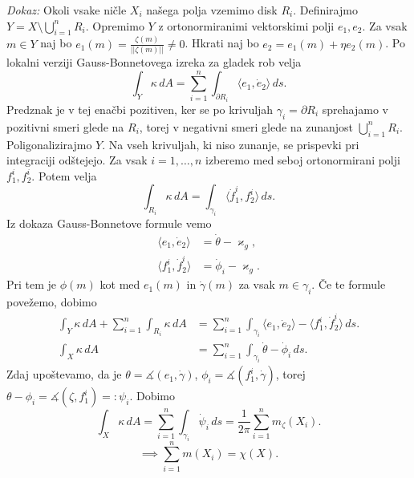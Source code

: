 \noindent
{\em Dokaz:\/}
Okoli vsake ničle $X_i$ našega polja vzemimo disk $R_i$. Definirajmo $Y = X \setminus \bigcup_{i = 1}^{n} R_i$. Opremimo $Y$ z ortonormiranimi vektorskimi polji $e_1, e_2$. Za vsak $m \in Y$ naj bo $e_1(m) = \frac{\zeta(m)}{\lvert\lvert \zeta(m) \rvert\rvert } \neq 0$. Hkrati naj bo
$e_2 = e_1(m) + \eta e_2(m)$. Po lokalni verziji Gauss-Bonnetovega izreka za gladek rob velja \begin{equation*}
\int_{Y} \kappa  \, dA = \sum_{i = 1}^{n} \int_{\partial R_i} \langle e_1, \dot{e}_2 \rangle   \, ds.  
\end{equation*}
Predznak je v tej enačbi pozitiven, ker se po krivuljah $\gamma_i = \partial R_i$ sprehajamo v pozitivni smeri glede na $R_i$, torej v negativni smeri glede na zunanjost $\bigcup_{i = 1}^{n} R_i$.    
Poligonalizirajmo $Y$. Na vseh krivuljah, ki niso zunanje, se prispevki pri integraciji odštejejo. Za vsak $i = 1 ,\ldots, n$ izberemo med seboj ortonormirani polji $f_1^{i}, f_2^{i}$. Potem velja \begin{equation*}
\int_{R_i} \kappa   \, dA = \int_{\gamma_i} \langle \dot{f}_1^{i}, f_2^{i} \rangle   \, ds.  
\end{equation*}  
Iz dokaza Gauss-Bonnetove formule vemo \begin{align*}
    \langle e_1, \dot{e}_2  \rangle  &= \dot{\theta} - \varkappa_g, \\
    \langle f_1^{i}, \dot{f}_2^{i}  \rangle  &= \dot{\phi}_i - \varkappa_g. 
\end{align*}
Pri tem je $\phi(m)$ kot med $e_1(m)$ in $\dot{\gamma}(m)$ za vsak $m \in  \gamma_i$. Če te formule povežemo, dobimo \begin{align*}
    \int_{Y} \kappa  \, dA  + \sum_{i = 1}^{n} \int_{R_i} \kappa \, dA  &= \sum_{i = 1}^{n} \int_{\gamma_i} \langle e_1, \dot{e}_2 \rangle  - \langle f_1^{i}, \dot{f}_2^{i} \rangle   \, ds.    \\
    \int_{X} \kappa  \, dA  &= \sum_{i = 1}^{n} \int_{\gamma_i} \dot{\theta} - \dot{\phi}_i \, ds.  
\end{align*}
Zdaj upoštevamo, da je $\theta = \measuredangle{(e_1, \dot{\gamma})}$, $\phi_i = \measuredangle{(f_1^{i}, \dot{\gamma})}$, torej $\theta - \phi_i = \measuredangle{(\zeta, f_1^{i})} =: \psi_i$.
Dobimo \begin{equation*}
\int_{X} \kappa  \, dA = \sum_{i = 1}^{n} \int_{\gamma_i} \dot{\psi}_i  \, ds = \frac{1}{2\pi} \sum_{i = 1}^{n} m_\zeta(X_i). 
\end{equation*}
\begin{equation*}
\implies \sum_{i = 1}^{n} m(X_i) = \chi(X).
\end{equation*}  
    
